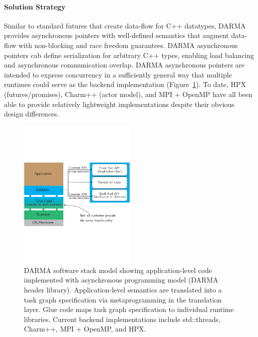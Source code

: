 \paragraph{Solution Strategy}
Similar to standard futures that create data-flow for C++ datatypes,
DARMA provides asynchronous pointers with well-defined semantics that augment data-flow with non-blocking and race freedom guarantees.
DARMA asynchronous pointers cab define serialization for arbitrary C++ types, enabling load balancing and asynchronous communication overlap.
DARMA asynchronous pointers are intended to express concurrency in a sufficiently general way that multiple runtimes could serve as the backend implementation (Figure~\ref{fig:darmaStack}).
To date, HPX (futures/promises), Charm++ (actor model), and MPI + OpenMP have all been able to provide relatively lightweight implementations despite their obvious design differences.


\begin{figure}
\centering
\includegraphics[width=0.5\textwidth]{projects/2.3.1-PMR/2.3.1.04-SNL-ATDM-PMR/DARMA_Software_Stack.pdf}
\caption{DARMA software stack model showing application-level code implemented with asynchronous programming model (DARMA header library).
Application-level semantics are translated into a task graph specification via metaprogramming in the translation layer. Glue code maps task graph specification to individual runtime libraries. Current backend implementations include std::threads, Charm++, MPI + OpenMP, and HPX.}
\label{fig:darmaStack}
\end{figure}



